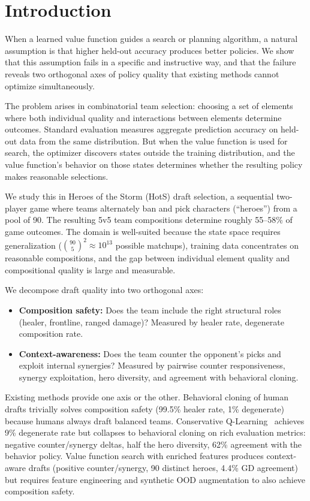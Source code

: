 \documentclass[journal]{IEEEtran}
\begin{document}
\section{Introduction}

When a learned value function guides a search or planning algorithm, a natural assumption is that higher held-out accuracy produces better policies. We show that this assumption fails in a specific and instructive way, and that the failure reveals two orthogonal axes of policy quality that existing methods cannot optimize simultaneously.

The problem arises in combinatorial team selection: choosing a set of elements where both individual quality and interactions between elements determine outcomes. Standard evaluation measures aggregate prediction accuracy on held-out data from the same distribution. But when the value function is used for search, the optimizer discovers states outside the training distribution, and the value function's behavior on those states determines whether the resulting policy makes reasonable selections.

We study this in Heroes of the Storm (HotS) draft selection, a sequential two-player game where teams alternately ban and pick characters (``heroes'') from a pool of 90. The resulting 5v5 team compositions determine roughly 55--58\% of game outcomes. The domain is well-suited because the state space requires generalization ($\binom{90}{5}^2 \approx 10^{13}$ possible matchups), training data concentrates on reasonable compositions, and the gap between individual element quality and compositional quality is large and measurable.

We decompose draft quality into two orthogonal axes:
\begin{itemize}
    \item \textbf{Composition safety:} Does the team include the right structural roles (healer, frontline, ranged damage)? Measured by healer rate, degenerate composition rate.
    \item \textbf{Context-awareness:} Does the team counter the opponent's picks and exploit internal synergies? Measured by pairwise counter responsiveness, synergy exploitation, hero diversity, and agreement with behavioral cloning.
\end{itemize}

Existing methods provide one axis or the other. Behavioral cloning of human drafts trivially solves composition safety (99.5\% healer rate, 1\% degenerate) because humans always draft balanced teams. Conservative Q-Learning~\cite{kumar2020conservative} achieves 9\% degenerate rate but collapses to behavioral cloning on rich evaluation metrics: negative counter/synergy deltas, half the hero diversity, 62\% agreement with the behavior policy. Value function search with enriched features produces context-aware drafts (positive counter/synergy, 90 distinct heroes, 4.4\% GD agreement) but requires feature engineering and synthetic OOD augmentation to also achieve composition safety.
\end{document}
